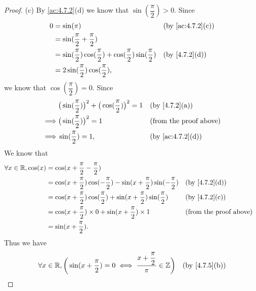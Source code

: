 \begin{proof}{(c)}
  By \cref{ac:4.7.2}(d) we know that \(\sin(\dfrac{\pi}{2}) > 0\).
  Since
  \begin{align*}
    0 & = \sin(\pi)                                                                             &  & \text{(by \cref{ac:4.7.2}(c))} \\
      & = \sin(\dfrac{\pi}{2} + \dfrac{\pi}{2})                                                                                     \\
      & = \sin(\dfrac{\pi}{2}) \cos(\dfrac{\pi}{2}) + \cos(\dfrac{\pi}{2}) \sin(\dfrac{\pi}{2}) &  & \text{(by \cref{4.7.2}(d))}    \\
      & = 2 \sin(\dfrac{\pi}{2}) \cos(\dfrac{\pi}{2}),
  \end{align*}
  we know that \(\cos(\dfrac{\pi}{2}) = 0\).
  Since
  \begin{align*}
             & \big(\sin(\dfrac{\pi}{2})\big)^2 + \big(\cos(\dfrac{\pi}{2})\big)^2 = 1 &  & \text{(by \cref{4.7.2}(a))}    \\
    \implies & \big(\sin(\dfrac{\pi}{2})\big)^2 = 1                                    &  & \text{(from the proof above)}  \\
    \implies & \sin(\dfrac{\pi}{2}) = 1,                                               &  & \text{(by \cref{ac:4.7.2}(d))}
  \end{align*}
  We know that
  \begin{align*}
    \forall x \in \R, \cos(x) & = \cos(x + \dfrac{\pi}{2} - \dfrac{\pi}{2})                                                                                          \\
                              & = \cos(x + \dfrac{\pi}{2}) \cos(-\dfrac{\pi}{2}) - \sin(x + \dfrac{\pi}{2}) \sin(-\dfrac{\pi}{2}) &  & \text{(by \cref{4.7.2}(d))}   \\
                              & = \cos(x + \dfrac{\pi}{2}) \cos(\dfrac{\pi}{2}) + \sin(x + \dfrac{\pi}{2}) \sin(\dfrac{\pi}{2})   &  & \text{(by \cref{4.7.2}(c))}   \\
                              & = \cos(x + \dfrac{\pi}{2}) \times 0 + \sin(x + \dfrac{\pi}{2}) \times 1                           &  & \text{(from the proof above)} \\
                              & = \sin(x + \dfrac{\pi}{2}).
  \end{align*}
  Thus we have
  \begin{align*}
         & \forall x \in \R, \bigg(\sin(x + \dfrac{\pi}{2}) = 0 \iff \dfrac{x + \dfrac{\pi}{2}}{\pi} \in \Z\bigg)  &  & \text{(by \cref{4.7.5}(b))}   \\

\end{align*}
\end{proof}
